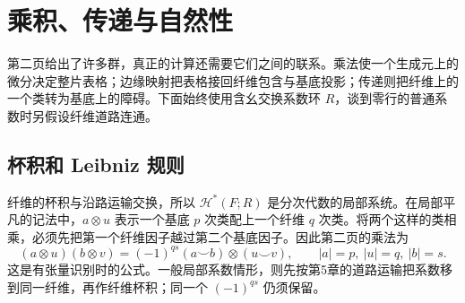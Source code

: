
% 
% 

\section{乘积、传递与自然性}
\label{g2:sec:1102}

第二页给出了许多群，真正的计算还需要它们之间的联系。乘法使一个生成元上的微分决定整片表格；边缘映射把表格接回纤维包含与基底投影；传递则把纤维上的一个类转为基底上的障碍。下面始终使用含幺交换系数环 \(R\)，谈到零行的普通系数时另假设纤维道路连通。

\subsection{杯积和 Leibniz 规则}
\label{g2:subsec:1102:01}

纤维的杯积与沿路运输交换，所以 \(\mathcal H^*(F;R)\) 是分次代数的局部系统。在局部平凡的记法中，\(a\otimes u\) 表示一个基底 \(p\) 次类配上一个纤维 \(q\) 次类。将两个这样的类相乘，必须先把第一个纤维因子越过第二个基底因子。因此第二页的乘法为
\begin{equation}\label{g2:eq:serre-product-sign}
	(a\otimes u)(b\otimes v)=(-1)^{q s}(a\smile b)\otimes(u\smile v),\qquad |a|=p,\ |u|=q,\ |b|=s.
\end{equation}
这是有张量识别时的公式。一般局部系数情形，则先按第5章的道路运输把系数移到同一纤维，再作纤维杯积；同一个 \((-1)^{qs}\) 仍须保留。

